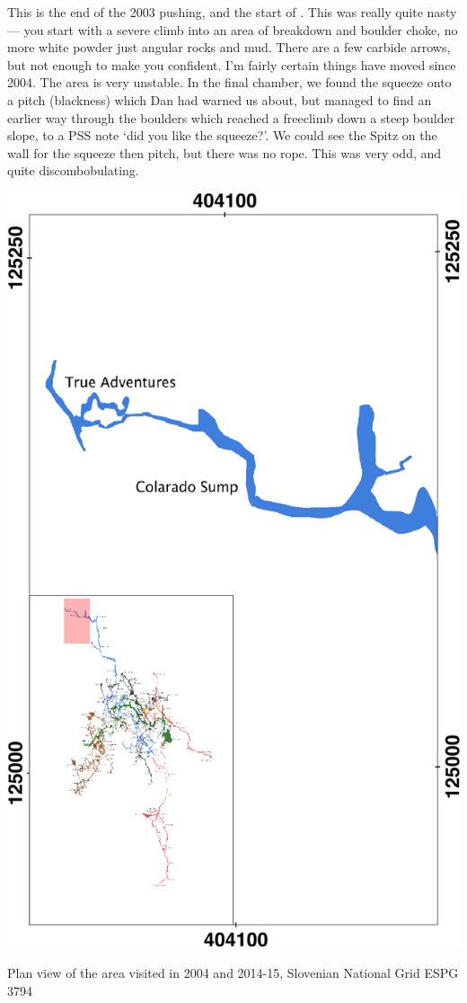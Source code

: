 This is the end of the 2003 pushing, and the start of . This was really quite nasty --- you start with a severe climb into an area of breakdown and boulder choke, no more white powder just angular rocks and mud. There are a few carbide arrows, but not enough to make you confident. I'm fairly certain things have moved since 2004. The area is very unstable. In the final chamber, we found the squeeze onto a pitch (blackness) which Dan had warned us about, but managed to find an earlier way through the boulders which reached a freeclimb down a steep boulder slope, to a PSS note `did you like the squeeze?'. We could see the Spitz on the wall for the squeeze then pitch, but there was no rope. This was very odd, and quite discombobulating.

\begin{marginfigure}
\checkoddpage \ifoddpage \forcerectofloat \else \forceversofloat \fi
\centering
 \includegraphics[width=\linewidth]{images/2014/jarv-2014/colarado_inset}
 \caption{Plan view of the \protect{} area visited in 2004 and 2014-15, Slovenian National Grid ESPG 3794}
 \label{colarado inset}
\end{marginfigure}

